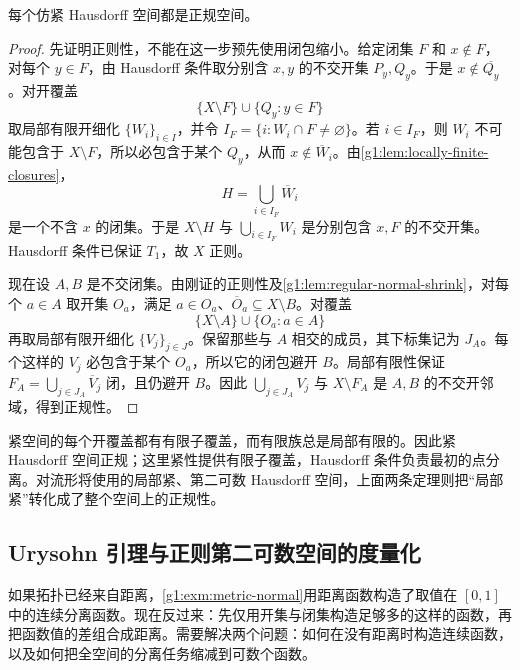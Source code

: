 \begin{theorem}\label{g1:thm:paracompact-normal}
	每个仿紧 Hausdorff 空间都是正规空间。
\end{theorem}
\begin{proof}
	先证明正则性，不能在这一步预先使用闭包缩小。给定闭集 \(F\) 和 \(x\notin F\)，对每个 \(y\in F\)，由 Hausdorff 条件取分别含 \(x,y\) 的不交开集 \(P_y,Q_y\)。于是 \(x\notin\overline{Q_y}\)。对开覆盖
	\[
		\{X\setminus F\}\cup\{Q_y:y\in F\}
	\]
	取局部有限开细化 \(\{W_i\}_{i\in I}\)，并令 \(I_F=\{i:W_i\cap F\ne\varnothing\}\)。若 \(i\in I_F\)，则 \(W_i\) 不可能包含于 \(X\setminus F\)，所以必包含于某个 \(Q_y\)，从而 \(x\notin\overline W_i\)。由\cref{g1:lem:locally-finite-closures}，
	\[
		H=\bigcup_{i\in I_F}\overline W_i
	\]
	是一个不含 \(x\) 的闭集。于是 \(X\setminus H\) 与 \(\bigcup_{i\in I_F}W_i\) 是分别包含 \(x,F\) 的不交开集。Hausdorff 条件已保证 \(T_1\)，故 \(X\) 正则。

	现在设 \(A,B\) 是不交闭集。由刚证的正则性及\cref{g1:lem:regular-normal-shrink}，对每个 \(a\in A\) 取开集 \(O_a\)，满足 \(a\in O_a\)、\(\overline O_a\subseteq X\setminus B\)。对覆盖
	\[
		\{X\setminus A\}\cup\{O_a:a\in A\}
	\]
	再取局部有限开细化 \(\{V_j\}_{j\in J}\)。保留那些与 \(A\) 相交的成员，其下标集记为 \(J_A\)。每个这样的 \(V_j\) 必包含于某个 \(O_a\)，所以它的闭包避开 \(B\)。局部有限性保证 \(F_A=\bigcup_{j\in J_A}\overline V_j\) 闭，且仍避开 \(B\)。因此 \(\bigcup_{j\in J_A}V_j\) 与 \(X\setminus F_A\) 是 \(A,B\) 的不交开邻域，得到正规性。
\end{proof}

紧空间的每个开覆盖都有有限子覆盖，而有限族总是局部有限的。因此紧 Hausdorff 空间正规；这里紧性提供有限子覆盖，Hausdorff 条件负责最初的点分离。对流形将使用的局部紧、第二可数 Hausdorff 空间，上面两条定理则把“局部紧”转化成了整个空间上的正规性。

\subsection{Urysohn 引理与正则第二可数空间的度量化}
\label{g1:subsec:0403:04}

如果拓扑已经来自距离，\cref{g1:exm:metric-normal}用距离函数构造了取值在 \([0,1]\) 中的连续分离函数。现在反过来：先仅用开集与闭集构造足够多的这样的函数，再把函数值的差组合成距离。需要解决两个问题：如何在没有距离时构造连续函数，以及如何把全空间的分离任务缩减到可数个函数。

